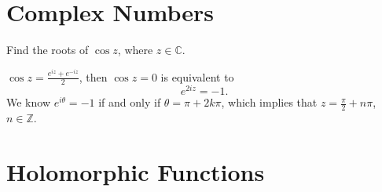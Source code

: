

\section{Complex Numbers}

\begin{exercise}{}{}
  Find the roots of $\cos z$, where $z \in \mathbb{C}$.
\end{exercise}

\begin{solution}
  $\cos z = \frac{e^{iz} + e^{-iz}}{2}$, then $\cos z = 0$ is equivalent to
  \begin{equation}
    e^{2iz} = -1.
  \end{equation}
  We know $e^{i\theta} = -1$ if and only if $\theta = \pi + 2k\pi$,
  which implies that $z = \frac{\pi}{2} + n\pi$, $n \in \mathbb{Z}$.
\end{solution}

\section{Holomorphic Functions}














